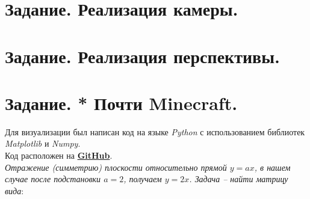 \documentclass[a5paper, 10pt]{article}
\theoremstyle{definition}
\theoremstyle{plain}
\theoremstyle{remark}
\begin{document}
\newpage
\section{Задание. Реализация камеры.}


\newpage
\section{Задание. Реализация перспективы.}



\newpage
\section{Задание. * Почти Minecraft.}



Для визуализации был написан код на языке \textit{Python} с использованием библиотек \textit{Matplotlib} и \textit{Numpy}. \\
Код расположен на \href{https://github.com/a-nechaeva/practical_Linal/tree/main/lab2/py_code}{\textbf{GitHub}}.
\\
\textit{Отражение (симметрию) плоскости относительно прямой $y=ax$, в нашем случае после подстановки $a=2$, получаем $y=2x$. Задача -- найти матрицу вида}:
\end{document}
